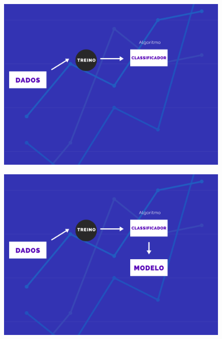 \documentclass[compress]{beamer}
\begin{document}
\begin{frame}{}
    \begin{figure}
        \centering
        \includegraphics[scale=.39]{img/3.png}
    \end{figure}
\end{frame}
\begin{frame}{}
    \begin{figure}
        \centering
        \includegraphics[scale=.39]{img/4.png}
    \end{figure}
\end{frame}
\end{document}
